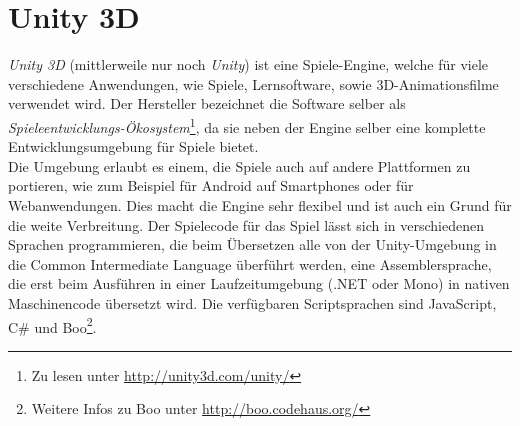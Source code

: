 \section{Unity 3D}

\textit{Unity 3D} (mittlerweile nur noch \textit{Unity}) ist eine Spiele-Engine, welche für viele verschiedene Anwendungen, wie Spiele, Lernsoftware, sowie 3D-Animationsfilme verwendet wird. Der Hersteller bezeichnet die Software selber als \textit{Spieleentwicklungs-Ökosystem}\footnote{Zu lesen unter \url{http://unity3d.com/unity/}}, da sie neben der Engine selber eine komplette Entwicklungsumgebung für Spiele bietet.\\
Die Umgebung erlaubt es einem, die Spiele auch auf andere Plattformen zu portieren, wie zum Beispiel für Android auf Smartphones oder für Webanwendungen. Dies macht die Engine sehr flexibel und ist auch ein Grund für die weite Verbreitung. Der Spielecode für das Spiel lässt sich in verschiedenen Sprachen programmieren, die beim Übersetzen alle von der Unity-Umgebung in die Common Intermediate Language überführt werden, eine Assemblersprache, die erst beim Ausführen in einer Laufzeitumgebung (.NET oder Mono) in nativen Maschinencode übersetzt wird. Die verfügbaren Scriptsprachen sind JavaScript, C\# und Boo\footnote{Weitere Infos zu Boo unter \url{http://boo.codehaus.org/}}.


